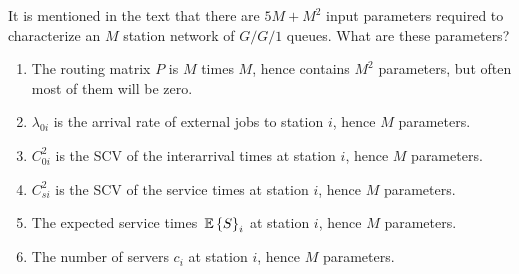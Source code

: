 \begin{question}
  It is mentioned in the text that there are $5M+M^2$ input parameters
  required to characterize an $M$ station network of $G/G/1$ queues. What are these parameters?
  \begin{solution}
    \begin{enumerate}
    \item The routing matrix $P$ is $M$ times $M$, hence contains
      $M^2$ parameters, but often most of them will be zero.
    \item $\lambda_{0i}$ is the arrival rate of external jobs to station $i$, hence $M$ parameters.
    \item $C_{0i}^2$ is the SCV of the interarrival times at station
      $i$, hence $M$ parameters.
    \item $C_{si}^2$ is the SCV of the service times at station $i$,
      hence $M$ parameters.
    \item The expected service times $\,\mathbb{E}\left\{S\right\}_i$ at station $i$, 
      hence $M$ parameters.
    \item The number of servers $c_i$ at station $i$, hence $M$
      parameters.
    \end{enumerate}
  \end{solution}
\end{question}



